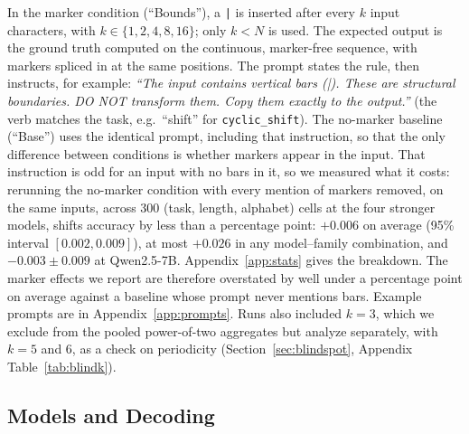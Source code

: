 \documentclass[10pt]{article} %
\newcommand{\task}[1]{\texttt{#1}}
\begin{document}
In the marker condition (``Bounds''), a \texttt{|} is inserted after every $k$ input characters, with $k \in \{1, 2, 4, 8, 16\}$; only $k < N$ is used. The expected output is the ground truth computed on the continuous, marker-free sequence, with markers spliced in at the same positions. The prompt states the rule, then instructs, for example: \emph{``The input contains vertical bars (|). These are structural boundaries. DO NOT transform them. Copy them exactly to the output.''} (the verb matches the task, e.g.\ ``shift'' for \task{cyclic\_shift}). The no-marker baseline (``Base'') uses the identical prompt, including that instruction, so that the only difference between conditions is whether markers appear in the input. That instruction is odd for an input with no bars in it, so we measured what it costs: rerunning the no-marker condition with every mention of markers removed, on the same inputs, across 300 (task, length, alphabet) cells at the four stronger models, shifts accuracy by less than a percentage point: $+0.006$ on average (95\% interval $[0.002, 0.009]$), at most $+0.026$ in any model--family combination, and $-0.003 \pm 0.009$ at Qwen2.5-7B. Appendix~\ref{app:stats} gives the breakdown. The marker effects we report are therefore overstated by well under a percentage point on average against a baseline whose prompt never mentions bars. Example prompts are in Appendix~\ref{app:prompts}. Runs also included $k = 3$, which we exclude from the pooled power-of-two aggregates but analyze separately, with $k = 5$ and 6, as a check on periodicity (Section~\ref{sec:blindspot}, Appendix Table~\ref{tab:blindk}).

\subsection{Models and Decoding}
\end{document}
